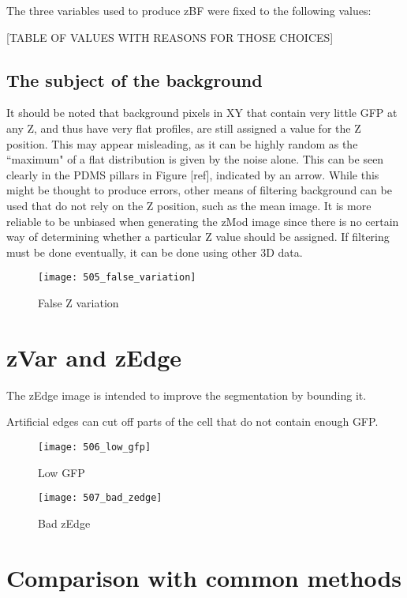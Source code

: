 The three variables used to produce zBF were fixed to the following values:

[TABLE OF VALUES WITH REASONS FOR THOSE CHOICES]

\subsection{The subject of the background}

It should be noted that background pixels in XY that contain very little GFP at any Z, and thus have very flat profiles, are still assigned a value for the Z position. This may appear misleading, as it can be highly random as the ``maximum" of a flat distribution is given by the noise alone. This can be seen clearly in the PDMS pillars in Figure [ref], indicated by an arrow. While this might be thought to produce errors, other means of filtering background can be used that do not rely on the Z position, such as the mean image. It is more reliable to be unbiased when generating the zMod image since there is no certain way of determining whether a particular Z value should be assigned. If filtering must be done eventually, it can be done using other 3D data.

\begin{figure}[p]
 \centering
 \texttt{[image: 505\_false\_variation]}
 \caption{
 	False Z variation
 }
 \label{fig:falsezvariation}
\end{figure}

\section{zVar and zEdge}

The zEdge image is intended to improve the segmentation by bounding it.

Artificial edges can cut off parts of the cell that do not contain enough GFP.

\begin{figure}[p]
 \centering
 \texttt{[image: 506\_low\_gfp]}
 \caption{
 	Low GFP
 }
 \label{fig:lowgfp}
\end{figure}

\begin{figure}[p]
 \centering
 \texttt{[image: 507\_bad\_zedge]}
 \caption{
 	Bad zEdge
 }
 \label{fig:badzedge}
\end{figure}

\section{Comparison with common methods}

